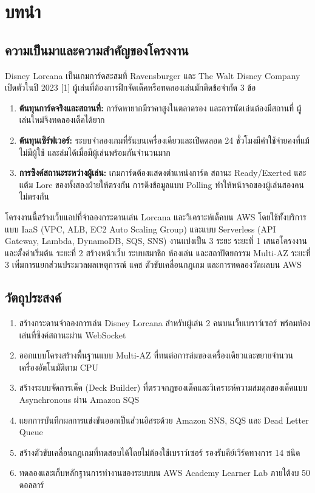 \chapter{บทนำ}

\section{ความเป็นมาและความสำคัญของโครงงาน}

Disney Lorcana เป็นเกมการ์ดสะสมที่ Ravensburger และ The Walt Disney Company เปิดตัวในปี 2023 [1] ผู้เล่นที่ต้องการฝึกจัดเด็คหรือทดลองเล่นมักติดข้อจำกัด 3 ข้อ

\begin{enumerate}
    \item \textbf{ต้นทุนการ์ดจริงและสถานที่:} การ์ดหายากมีราคาสูงในตลาดรอง และการนัดเล่นต้องมีสถานที่ ผู้เล่นใหม่จึงทดลองเด็คได้ยาก
    \item \textbf{ต้นทุนเซิร์ฟเวอร์:} ระบบจำลองเกมที่รันบนเครื่องเดียวและเปิดตลอด 24 ชั่วโมงมีค่าใช้จ่ายคงที่แม้ไม่มีผู้ใช้ และล่มได้เมื่อมีผู้เล่นพร้อมกันจำนวนมาก
    \item \textbf{การซิงค์สถานะระหว่างผู้เล่น:} เกมการ์ดต้องแสดงตำแหน่งการ์ด สถานะ Ready/Exerted และแต้ม Lore ของทั้งสองฝ่ายให้ตรงกัน การดึงข้อมูลแบบ Polling ทำให้หน้าจอของผู้เล่นสองคนไม่ตรงกัน
\end{enumerate}

โครงงานนี้สร้างเว็บแอปที่จำลองกระดานเล่น Lorcana และวิเคราะห์เด็คบน AWS โดยใช้ทั้งบริการแบบ IaaS (VPC, ALB, EC2 Auto Scaling Group) และแบบ Serverless (API Gateway, Lambda, DynamoDB, SQS, SNS) งานแบ่งเป็น 3 ระยะ ระยะที่ 1 เสนอโครงงานและตั้งค่าเริ่มต้น ระยะที่ 2 สร้างหน้าเว็บ ระบบสมาชิก ห้องเล่น และสถาปัตยกรรม Multi-AZ ระยะที่ 3 เพิ่มการแยกส่วนประมวลผลเหตุการณ์ แคช ตัวขับเคลื่อนกฎเกม และการทดลองวัดผลบน AWS

\section{วัตถุประสงค์}

\begin{enumerate}
    \item สร้างกระดานจำลองการเล่น Disney Lorcana สำหรับผู้เล่น 2 คนบนเว็บเบราว์เซอร์ พร้อมห้องเล่นที่ซิงค์สถานะผ่าน WebSocket
    \item ออกแบบโครงสร้างพื้นฐานแบบ Multi-AZ ที่ทนต่อการล่มของเครื่องเดียวและขยายจำนวนเครื่องอัตโนมัติตาม CPU
    \item สร้างระบบจัดการเด็ค (Deck Builder) ที่ตรวจกฎของเด็คและวิเคราะห์ความสมดุลของเด็คแบบ Asynchronous ผ่าน Amazon SQS
    \item แยกการบันทึกผลการแข่งขันออกเป็นส่วนอิสระด้วย Amazon SNS, SQS และ Dead Letter Queue
    \item สร้างตัวขับเคลื่อนกฎเกมที่ทดสอบได้โดยไม่ต้องใช้เบราว์เซอร์ รองรับคีย์เวิร์ดทางการ 14 ชนิด
    \item ทดลองและเก็บหลักฐานการทำงานของระบบบน AWS Academy Learner Lab ภายใต้งบ 50 ดอลลาร์
\end{enumerate}

